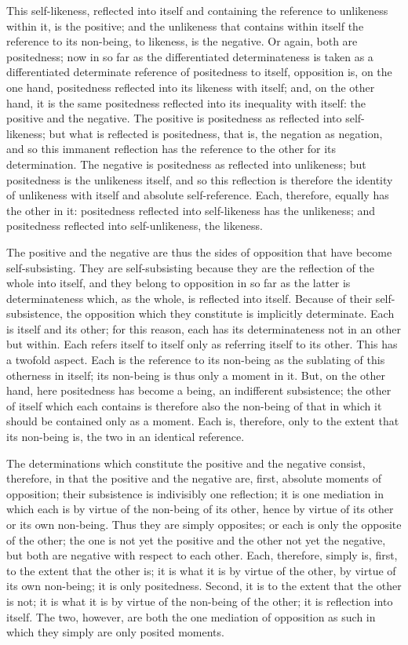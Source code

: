This self-likeness, reflected into itself
and containing the reference to
unlikeness within it, is the positive;
and the unlikeness that contains within itself
the reference to its non-being,
to likeness, is the negative.
Or again, both are positedness;
now in so far as the differentiated determinateness is
taken as a differentiated determinate reference of
positedness to itself, opposition is, on the one hand,
positedness reflected into its likeness with itself;
and, on the other hand, it is the same positedness
reflected into its inequality with itself:
the positive and the negative.
The positive is positedness as reflected into self-likeness;
but what is reflected is positedness, that is,
the negation as negation,
and so this immanent reflection has
the reference to the other for its determination.
The negative is positedness as reflected into unlikeness;
but positedness is the unlikeness itself,
and so this reflection is therefore
the identity of unlikeness with itself
and absolute self-reference.
Each, therefore, equally has the other in it:
positedness reflected into self-likeness has the unlikeness;
and positedness reflected into self-unlikeness, the likeness.

The positive and the negative are thus
the sides of opposition that have become self-subsisting.
They are self-subsisting because they are
the reflection of the whole into itself,
and they belong to opposition in so far
as the latter is determinateness
which, as the whole, is reflected into itself.
Because of their self-subsistence,
the opposition which they constitute is
implicitly determinate.
Each is itself and its other;
for this reason, each has its determinateness
not in an other but within.
Each refers itself to itself
only as referring itself to its other.
This has a twofold aspect.
Each is the reference to its non-being as
the sublating of this otherness in itself;
its non-being is thus only a moment in it.
But, on the other hand, here positedness
has become a being, an indifferent subsistence;
the other of itself which each contains is
therefore also the non-being of that in which
it should be contained only as a moment.
Each is, therefore, only to the
extent that its non-being is,
the two in an identical reference.

The determinations which constitute
the positive and the negative consist,
therefore, in that the positive and the negative are,
first, absolute moments of opposition;
their subsistence is indivisibly one reflection;
it is one mediation in which each is
by virtue of the non-being of its other,
hence by virtue of its other
or its own non-being.
Thus they are simply opposites;
or each is only the opposite of the other;
the one is not yet the positive
and the other not yet the negative,
but both are negative with
respect to each other.
Each, therefore, simply is,
first, to the extent that the other is;
it is what it is by virtue of the other,
by virtue of its own non-being;
it is only positedness.
Second, it is to the extent that
the other is not; it is what it is
by virtue of the non-being of the other;
it is reflection into itself.
The two, however, are both
the one mediation of opposition as such
in which they simply are only posited moments.

